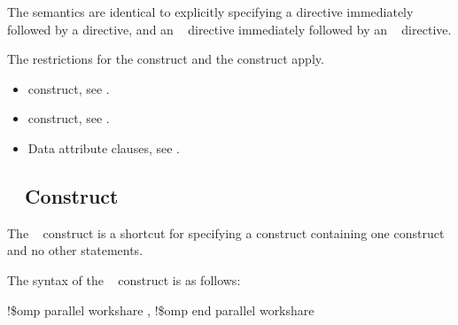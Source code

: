 \fortranspecificstart
The semantics are identical to explicitly specifying a  directive immediately 
followed by a  directive, and an ~ directive immediately 
followed by an ~ directive. 
\fortranspecificend

\restrictions
The restrictions for the  construct and the  construct apply.

\crossreferences
\begin{itemize}
\item {} construct, see 
. 

\item {} construct, see 
.

\item Data attribute clauses, see 
.
\end{itemize}









\vspace{3\baselineskip}
\fortranspecificstart
\vspace{-3\baselineskip}
\subsection{~ Construct}
\label{subsec:parallel workshare Construct}
\summary
The ~ construct is a shortcut for specifying a  
construct containing one  construct and no other statements.

\syntax
The syntax of the ~ construct is as follows:

\begin{boxedcode}
!\$omp parallel workshare \plc{[clause[ [},\plc{] clause] ... ]}
!\$omp end parallel workshare
\end{boxedcode}

